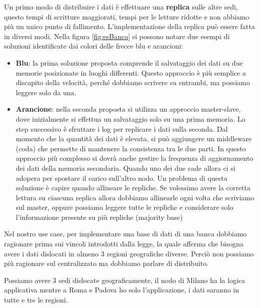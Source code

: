 Un primo modo di distribuire i dati è effettuare una \textbf{replica} sulle altre 
sedi, questo tempi di scritture maggiorati, tempi per le letture ridotte e 
non abbiamo più un unico punto di fallimento. L'implementazione della replica può
essere fatta in diversi modi. Nella figura \ref{fig:esBanca} si possono notare due 
esempi di soluzioni identificate dai colori delle frecce blu e arancioni:
\begin{itemize}
    \item \textbf{Blu}: la prima soluzione proposta comprende il salvataggio
          dei dati su due memorie posizionate in luoghi differenti. Questo approccio è più
          semplice a discapito della velocità, perché dobbiamo scrivere su entrambi,
          ma possiamo leggere solo da una.
    \item \textbf{Arancione}: nella seconda proposta si utilizza un approccio
          master-slave, dove inizialmente si effettua un salvataggio solo su una
          prima memoria. Lo step successivo è sfruttare i log per replicare i
          dati sulla seconda. Dal momento che la quantità dei dati è elevata,
          si può aggiungere un middleware (coda) che permette di mantenere la
          consistenza tra le due parti. In questo approccio più complesso si
          dovrà anche gestire la frequenza di aggiornamento dei dati della
          memoria secondaria. Quando uno dei due cade allora ci si adopera per
          spostare il carico sull'altro nodo. Un problema di questa soluzione è 
          capire quando allineare le repliche. Se volessimo avere la corretta 
          lettura su ciascuna replica allora dobbiamo allinearle ogni volta che 
          scriviamo sul master, oppure possiamo leggere tutte le repliche e 
          considerare solo l'informazione presente su più repliche (majority base)
\end{itemize}
Nel nostro use case, per implementare una base di dati di una banca dobbiamo ragionare
prima sui vincoli introdotti dalla legge, la quale afferma che bisogna avere i
dati dislocati in almeno $3$ regioni geografiche diverse. Perciò non possiamo più
ragionare sul centralizzato ma dobbiamo parlare di distribuito.

Possiamo avere $3$ sedi dislocate geograficamente, il nodo di Milano ha la logica
applicativa mentre a Roma e Padova ho solo l'applicazione, i dati saranno in tutte
e tre le regioni.

